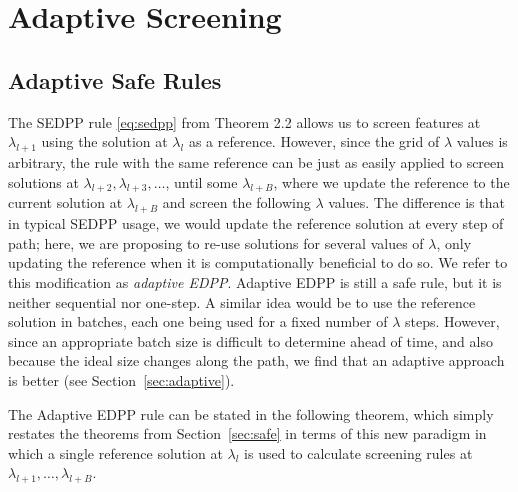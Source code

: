 \documentclass[]{interact}
\theoremstyle{plain}%
\theoremstyle{definition}
\theoremstyle{remark}
\providecommand{\lam}{\lambda}
\begin{document}
\section{Adaptive Screening}
\label{sec:method}


\subsection{Adaptive Safe Rules}

The SEDPP rule \eqref{eq:sedpp} from Theorem 2.2 allows us to screen features at $\lambda_{l+1}$ using the solution at $\lambda_l$ as a reference. However, since the grid of $\lam$ values is arbitrary, the rule with the same reference can be just as easily applied to screen solutions at $\lam_{l+2}, \lam_{l+3}, \ldots$, until some $\lam_{l+B}$, where we update the reference to the current solution at $\lam_{l+B}$ and screen the following $\lam$ values.  The difference is that in typical SEDPP usage, we would update the reference solution at every step of path; here, we are proposing to re-use solutions for several values of $\lam$, only updating the reference when it is computationally beneficial to do so.  We refer to this modification as \emph{adaptive EDPP}.  Adaptive EDPP is still a safe rule, but it is neither sequential nor one-step.   A similar idea would be to use the reference solution in batches, each one being used for a fixed number of $\lam$ steps.  However, since an appropriate batch size is difficult to determine ahead of time, and also because the ideal size changes along the path, we find that an adaptive approach is better (see Section~\ref{sec:adaptive}).

The Adaptive EDPP rule can be stated in the following theorem, which simply restates the theorems from Section~\ref{sec:safe} in terms of this new paradigm in which a single reference solution at $\lam_l$ is used to calculate screening rules at $\lam_{l+1}, \ldots, \lam_{l+B}$.
\end{document}
